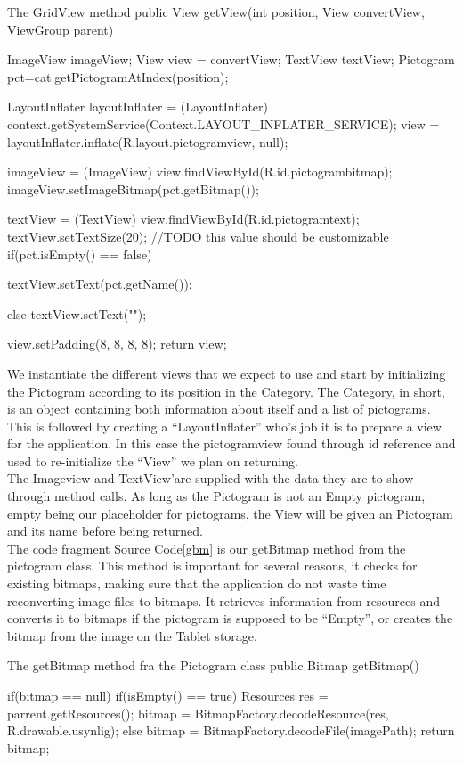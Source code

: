 \begin{source}[{gridviewm}]{The GridView method}
	public View getView(int position, View convertView, ViewGroup parent) 
	{
		ImageView imageView;
		View view = convertView;
		TextView textView;
		Pictogram pct=cat.getPictogramAtIndex(position);

		LayoutInflater layoutInflater = (LayoutInflater) context.getSystemService(Context.LAYOUT_INFLATER_SERVICE);
		view = layoutInflater.inflate(R.layout.pictogramview, null);

		imageView = (ImageView) view.findViewById(R.id.pictogrambitmap); 
		imageView.setImageBitmap(pct.getBitmap());

		textView = (TextView) view.findViewById(R.id.pictogramtext);
		textView.setTextSize(20);	//TODO this value should be customizable
		if(pct.isEmpty() == false)
		{

			textView.setText(pct.getName());
		}
		else
		{
			textView.setText("");
		}

		view.setPadding(8, 8, 8, 8);
		return view;
	}
\end{source}
We instantiate the different views that we expect to use and start by initializing the Pictogram according to its position in the Category.
The Category, in short, is an object containing both information about itself and a list of pictograms.
This is followed by creating a ``LayoutInflater'' who's job it is to prepare a view for the application.
In this case the pictogramview found through id reference and used to re-initialize the ``View'' we plan on returning.\\
The Imageview and TextView'are supplied with the data they are to show through method calls. 
As long as the Pictogram is not an Empty pictogram, empty being our placeholder for pictograms, the View will be given an Pictogram and its name before being returned.\\

The code fragment Source Code\ref{gbm} is our getBitmap method from the pictogram class.
This method is important for several reasons, it checks for existing bitmaps, making sure that the application do not waste time reconverting image files to bitmaps.
It retrieves information from resources and converts it to bitmaps if the pictogram is supposed to be ``Empty'', or creates the bitmap from the image on the Tablet storage.

\begin{source}[{gbm}]{The getBitmap method fra the Pictogram class}
	public Bitmap getBitmap()
	{
		if(bitmap == null)
		{
			if(isEmpty() == true)
			{
				Resources res = parrent.getResources();
				bitmap = BitmapFactory.decodeResource(res, R.drawable.usynlig);
			}
			else
			{
				bitmap = BitmapFactory.decodeFile(imagePath);
			}
		}
		return bitmap;
	
	}
\end{source}



